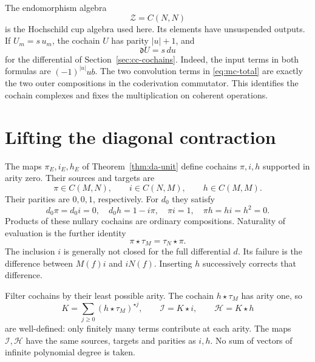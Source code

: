 The endomorphism algebra
\[
 \mathcal Z=C(N,N)
\]
is the Hochschild cup algebra used here. Its elements have
unsuspended outputs. If \(U_m=s\,u_m\), the cochain \(U\) has
parity \(|u|+1\), and
\[
 \mathfrak dU=s\,du
\]
for the differential of Section~\ref{sec:cc-cochains}.
Indeed, the input terms in both formulas are
\((-1)^{|u|}u b\). The two convolution terms in
\eqref{eq:mc-total} are exactly the two outer compositions in
the coderivation commutator. This identifies the cochain
complexes and fixes the multiplication on coherent operations.

\section{Lifting the diagonal contraction}
\label{sec:mc-lift}

The maps \(\pi_E,i_E,h_E\) of Theorem~\ref{thm:da-unit}
define cochains \(\pi,i,h\) supported in arity zero.
Their sources and targets are
\[
 \pi\in C(M,N),\qquad i\in C(N,M),\qquad h\in C(M,M).
\]
Their parities are \(0,0,1\), respectively. For \(d_0\) they
satisfy
\[
 d_0\pi=d_0i=0,\quad d_0h=1-i\pi,\quad
 \pi i=1,\quad \pi h=hi=h^2=0.
\]
Products of these nullary cochains are ordinary compositions.
Naturality of evaluation is the further identity
\[
 \pi\star\tau_M=\tau_N\star\pi.
\]
The inclusion \(i\) is generally not closed for the full
differential \(d\). Its failure is the difference between
\(M(f)i\) and \(iN(f)\). Inserting \(h\) successively corrects
that difference.

Filter cochains by their least possible arity. The cochain
\(h\star\tau_M\) has arity one, so
\begin{equation}
 K=\sum_{j\geq0}(h\star\tau_M)^{\star j},\qquad
 \mathcal I=K\star i,\qquad \mathcal H=K\star h
 \label{eq:mc-lifted-maps}
\end{equation}
are well-defined: only finitely many terms contribute at each
arity. The maps \(\mathcal I,\mathcal H\) have the same sources,
targets and parities as \(i,h\).
No sum of vectors of infinite polynomial degree is taken.

